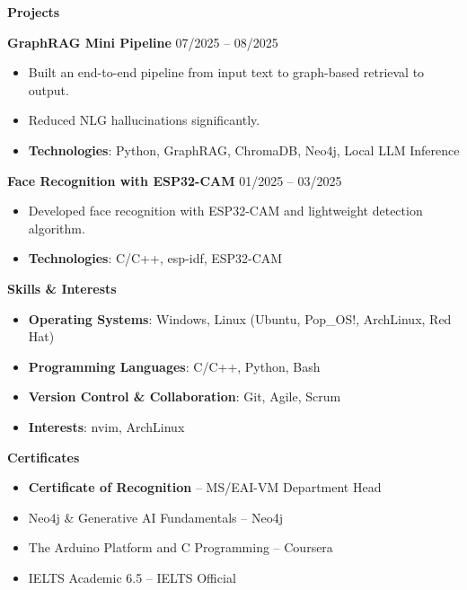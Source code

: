 \documentclass[11pt]{article}
\begin{document}
\begin{center}
    \textbf{Projects}
\end{center}

\textbf{GraphRAG Mini Pipeline} \hfill 07/2025 -- 08/2025
\begin{itemize}[noitemsep, topsep=0pt, parsep=0pt]
    \item Built an end-to-end pipeline from input text to graph-based retrieval to output.
    \item Reduced NLG hallucinations significantly.
    \item \textbf{Technologies}: Python, GraphRAG, ChromaDB, Neo4j, Local LLM Inference
\end{itemize}

\textbf{Face Recognition with ESP32-CAM} \hfill 01/2025 -- 03/2025
\begin{itemize}[noitemsep, topsep=0pt, parsep=0pt]
    \item Developed face recognition with ESP32-CAM and lightweight detection algorithm.
    \item \textbf{Technologies}: C/C++, esp-idf, ESP32-CAM
\end{itemize}

\begin{center}
    \textbf{Skills \& Interests}
\end{center}
\begin{itemize}[noitemsep, topsep=0pt, parsep=0pt]
    \item \textbf{Operating Systems}: Windows, Linux (Ubuntu, Pop\_OS!, ArchLinux, Red Hat)
    \item \textbf{Programming Languages}: C/C++, Python, Bash
    \item \textbf{Version Control \& Collaboration}: Git, Agile, Scrum
    \item \textbf{Interests}: nvim, ArchLinux
\end{itemize}

\begin{center}
    \textbf{Certificates}
\end{center}
\begin{itemize}[noitemsep, topsep=0pt, parsep=0pt]
    \item \textbf{Certificate of Recognition} -- MS/EAI-VM Department Head
    \item Neo4j \& Generative AI Fundamentals -- Neo4j
    \item The Arduino Platform and C Programming -- Coursera
    \item IELTS Academic 6.5 -- IELTS Official
\end{itemize}
\end{document}
